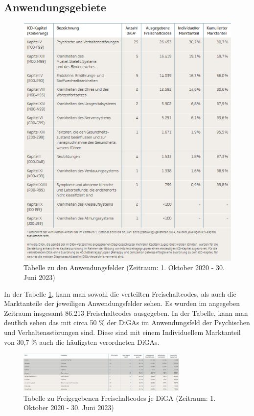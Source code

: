 \documentclass{article}
\begin{document}
		\subsection{Anwendungsgebiete}
			\begin{figure}[htbp]
				\centering
				\includegraphics[height=0.5\textheight]{./grafiken/tabelle_anwendungsfelder_diga}
				\caption[Anwendungsfelder der DiGA]{Tabelle zu den Anwendungsfelder (Zeitraum: 1. Oktober 2020 - 30. Juni 2023)}
				\label{Tab-anwendungsfelder-diga}
			\end{figure}
			In der Tabelle \ref{Tab-anwendungsfelder-diga}, kann man sowohl die verteilten Freischaltcodes, als auch die Marktanteile der jeweiligen Anwendungsfelder sehen. Es wurden im angegeben Zeitraum insgesamt 86.213 Freischaltcodes ausgegeben. In der Tabelle, kann man deutlich sehen das mit circa 50 \% der DiGAs im Anwendungsfeld der Psychischen und Verhaltensstörungen sind. Diese sind mit einem Individuellem Marktanteil von 30,7 \% auch die häufigsten verordneten DiGAs.
			\newpage
			\begin{figure}[htbp]
				\centering
				\includegraphics[width=0.75\textwidth]{./grafiken/tab_diga_verteilung}
				\caption[Freigegebene Freischaltcode je DiGA]{Tabelle zu Freigegebenen Freischaltcodes je DiGA (Zeitraum: 1. Oktober 2020 - 30. Juni 2023)}
				\label{Tab-freischaltcodes-je-diga}
			\end{figure}
\end{document}
